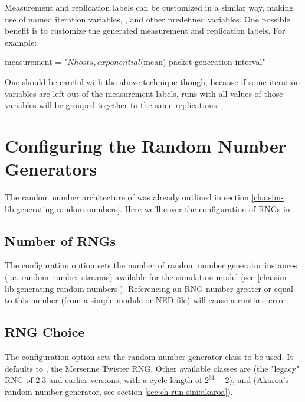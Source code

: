 Measurement and replication labels can be customized in a similar way,
making use of named iteration variables, ,
 and other predefined variables. One possible benefit is
to customize the generated measurement and replication labels. For
example:

\begin{inifile}
measurement = "${N} hosts, exponential(${mean}) packet generation interval"
\end{inifile}

One should be careful with the above technique though, because if some
iteration variables are left out of the measurement labels, runs with
all values of those variables will be grouped together to the same
replications.


\section{Configuring the Random Number Generators}
\label{sec:ch-config-sim:rng-config}

The random number architecture of {\opp} was already outlined
in section \ref{cha:sim-lib:generating-random-numbers}. Here
we'll cover the configuration of RNGs in .

\subsection{Number of RNGs}

The  configuration option sets the number of
random number generator instances (i.e. random number streams)
available for the simulation model (see \ref{cha:sim-lib:generating-random-numbers}).
Referencing an RNG number greater or equal to this number
(from a simple module or NED file) will cause a runtime error.


\subsection{RNG Choice}

The  configuration option sets the random number
generator class to be used. It defaults to ,
the Mersenne Twister RNG. Other available classes are 
(the "legacy" RNG of {\opp} 2.3 and earlier versions, with a cycle length
of $2^{31}-2$), and  (Akaroa's random number generator,
see section \ref{sec:ch-run-sim:akaroa}).

